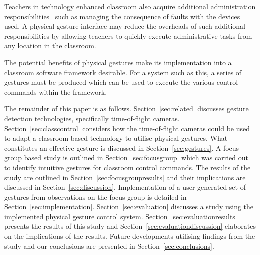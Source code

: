 \documentclass[manuscript, review, screen]{acmart}
\begin{document}
Teachers in technology enhanced classroom also acquire additional administration responsibilities~\cite{Kuhn2005} such as managing the consequence of faults with the devices used.
A physical gesture interface may reduce the overheads of such additional responsibilities by allowing teachers to quickly execute administrative tasks from any location in the classroom.

The potential benefits of physical gestures make its implementation into a classroom software framework desirable.
For a system such as this, a series of gestures must be produced which can be used to execute the various control commands within the framework.

The remainder of this paper is as follows. 
Section~\ref{sec:related} discusses gesture detection technologies, specifically time-of-flight cameras.
Section~\ref{sec:classcontrol} considers how the time-of-flight cameras could be used to adapt a classroom-based technology to utilise physical gestures.
What constitutes an effective gesture is discussed in Section~\ref{sec:gestures}.
A focus group based study is outlined in Section~\ref{sec:focusgroup} which was carried out to identify intuitive gestures for classroom control commands.
The results of the study are outlined in Section~\ref{sec:focusgroupresults} and their implications are discussed in Section~\ref{sec:discussion}. 
Implementation of a user generated set of gestures from observations on the focus group is detailed in Section~\ref{sec:implementation}.
Section~\ref{sec:evaluation} discusses a study using the implemented physical gesture control system.
Section~\ref{sec:evaluationresults} presents the results of this study and Section~\ref{sec:evaluationdiscussion} elaborates on the implications of the results.
Future developments utilising findings from the study and our conclusions are presented in Section~\ref{sec:conclusions}.


\end{document}
